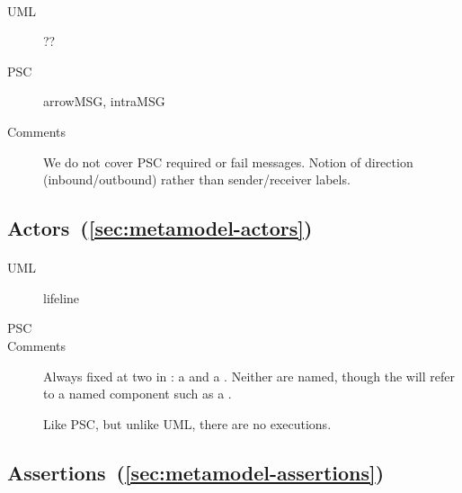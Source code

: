 \paragraph{\mmessagespec}
\begin{description}
\item[UML] ??
\item[PSC] arrowMSG, intraMSG
\item[Comments]
  We do not cover PSC required or fail messages.
  Notion of direction (inbound/outbound) rather than sender/receiver labels.
\end{description}

\subsection{Actors~(\ref{sec:metamodel-actors})}

\paragraph{\mactor}
\begin{description}
\item[UML] lifeline
\item[PSC] 
\item[Comments]
  Always fixed at two in \langname: a \mtarget{} and a \mworld{}.
  Neither are named, though the \mtarget{} will refer to a
  named component such as a \mrcmodule.

  Like PSC, but unlike UML, there are no executions.
\end{description}

\subsection{Assertions~(\ref{sec:metamodel-assertions})}

